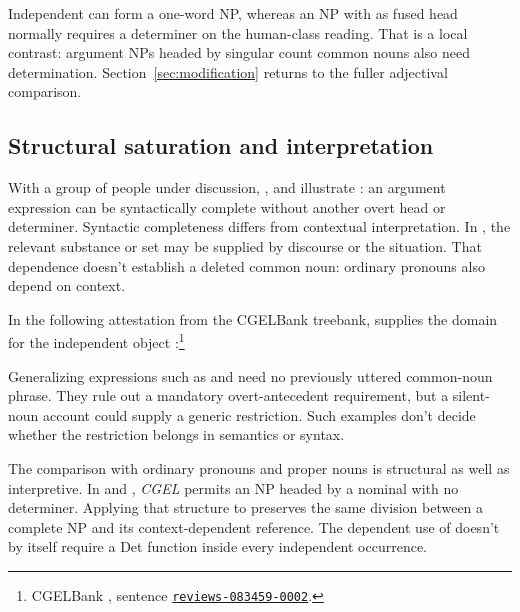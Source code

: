 \documentclass[12pt]{article}
\begin{document}
Independent  can form a one-word NP, whereas an NP with  as fused head normally requires a determiner on the human-class reading. That is a local contrast: argument NPs headed by singular count common nouns also need determination. Section~\ref{sec:modification} returns to the fuller adjectival comparison.

\subsection{Structural saturation and interpretation}

With a group of people under discussion, ,  and  illustrate : an argument expression can be syntactically complete without another overt head or determiner. Syntactic completeness differs from contextual interpretation. In , the relevant substance or set may be supplied by discourse or the situation. That dependence doesn't establish a deleted common noun: ordinary pronouns also depend on context.

In the following attestation from the CGELBank treebank,  supplies the domain for the independent object :\footnote{CGELBank \citep{reynolds2023unified}, sentence \href{https://github.com/nert-nlp/cgel/blob/d0a2c2d8c522b23d5aa879fc9cb94948f4285b2c/datasets/ewt.cgel\#L651-L654}{\nolinkurl{reviews-083459-0002}}.}
\ea\label{ex:attested-both}
\z

Generalizing expressions such as  and  need no previously uttered common-noun phrase. They rule out a mandatory overt-antecedent requirement, but a silent-noun account could supply a generic restriction. Such examples don't decide whether the restriction belongs in semantics or syntax.

The comparison with ordinary pronouns and proper nouns is structural as well as interpretive. In  and , \textit{CGEL} permits an NP headed by a nominal with no determiner. Applying that structure to  preserves the same division between a complete NP and its context-dependent reference. The dependent use of  doesn't by itself require a Det function inside every independent occurrence.
\end{document}
